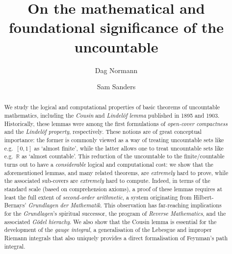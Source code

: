 \documentclass[reqno]{amsart}
\def\R{{\mathbb  R}}
\numberwithin{equation}{section}
\numberwithin{thm}{section}
\begin{document}
\title[On the significance of the uncountable]{On the mathematical and foundational significance of the uncountable}
\author{Dag Normann}
\address{Department of Mathematics, The University 
of Oslo, P.O. Box 1053, Blindern N-0316}
\author{Sam Sanders}
\address{Center for Advanced Studies and MCMP, LMU Munich, Germany}
\begin{abstract}
We study the logical and computational properties of basic theorems of uncountable mathematics, including the \emph{Cousin} and \emph{Lindel\"of lemma} published in 1895 and 1903.  Historically, these lemmas were among the first formulations of \emph{open-cover compactness} and the \emph{Lindel\"of property}, respectively.
These notions are of great conceptual importance: the former is commonly viewed as a way of treating uncountable sets like e.g.\ $[0,1]$ as `almost finite', while the latter allows one to treat uncountable sets like e.g.\ $\R$ as `almost countable'. 
This reduction of the uncountable to the finite/countable turns out to have a \emph{considerable} logical and computational cost: we show that the aforementioned lemmas, and many related theorems, are \emph{extremely} hard to prove, while the associated sub-covers are \emph{extremely} hard to compute.
Indeed, in terms of the standard scale (based on comprehension axioms), a proof of these lemmas requires at least the full extent of \emph{second-order arithmetic}, a system originating from Hilbert-Bernays' \emph{Grundlagen der Mathematik}.  This observation has far-reaching implications for the \emph{Grundlagen}'s spiritual successor, the program of \emph{Reverse Mathematics}, and the associated \emph{G\"odel hierachy}. 
We also show that the Cousin lemma is essential for the development of the \emph{gauge integral}, a generalisation of the Lebesgue and improper Riemann integrals that also uniquely provides a direct formalisation of Feynman's path integral.  
\end{abstract}
\end{document}
